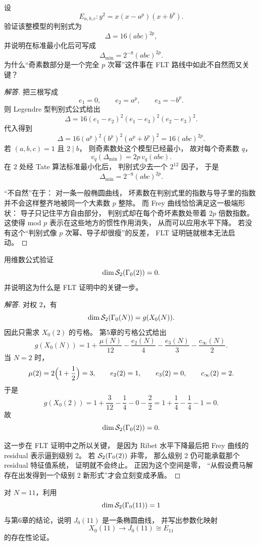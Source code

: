 \begin{exercise}
设
\[
  E_{a,b,c}\colon y^2=x(x-a^p)(x+b^p).
\]
验证该整模型的判别式为
\[
  \Delta=16(abc)^{2p},
\]
并说明在标准最小化后可写成
\[
  \Delta_{\min}=2^{-8}(abc)^{2p}.
\]
为什么“奇素数部分是一个完全 $p$ 次幂”这件事在 FLT 路线中如此不自然而又关键？
\end{exercise}

\begin{proof}[解答]
把三根写成
\[
  e_1=0,
  \qquad e_2=a^p,
  \qquad e_3=-b^p.
\]
则 Legendre 型判别式公式给出
\[
  \Delta=16(e_1-e_2)^2(e_1-e_3)^2(e_2-e_3)^2.
\]
代入得到
\[
  \Delta=16(a^p)^2(b^p)^2(a^p+b^p)^2=16(abc)^{2p}.
\]
若 $(a,b,c)=1$ 且 $2\mid b$，
则奇素数处这个模型已经最小，
故对每个奇素数 $q$，
\[
  v_q(\Delta_{\min})=2p\,v_q(abc).
\]
在 $2$ 处经 Tate 算法标准最小化后，
判别式少去一个 $2^{12}$ 因子，
于是
\[
  \Delta_{\min}=2^{-8}(abc)^{2p}.
\]

“不自然”在于：
对一条一般椭圆曲线，
坏素数在判别式里的指数与导子里的指数并不会这样整齐地被同一个大素数 $p$ 整除。
而 Frey 曲线恰恰满足这一极端形状：
导子只记住平方自由部分，
判别式却在每个奇坏素数处带着 $2p$ 倍数指数。
这使得 mod $p$ 表示在这些地方的惯性作用消失，
从而可以应用水平下降。
若没有这个“判别式像 $p$ 次幂、导子却很瘦”的反差，
FLT 证明链就根本无法启动。
\end{proof}

\begin{exercise}
用维数公式验证
\[
  \dim \mathcal{S}_2(\Gamma_0(2))=0.
\]
并说明这为什么是 FLT 证明中的关键一步。
\end{exercise}

\begin{proof}[解答]
对权 $2$，有
\[
  \dim \mathcal{S}_2(\Gamma_0(N))=g(X_0(N)).
\]
因此只需求 $X_0(2)$ 的亏格。
第5章的亏格公式给出
\[
  g(X_0(N))=1+\frac{\mu(N)}{12}-\frac{e_2(N)}{4}-\frac{e_3(N)}{3}-\frac{c_\infty(N)}{2}.
\]
当 $N=2$ 时，
\[
  \mu(2)=2\Bigl(1+\frac12\Bigr)=3,
  \qquad e_2(2)=1,
  \qquad e_3(2)=0,
  \qquad c_\infty(2)=2.
\]
于是
\[
  g(X_0(2))
  =1+\frac{3}{12}-\frac14-0-\frac22
  =1+\frac14-\frac14-1=0.
\]
故
\[
  \dim \mathcal{S}_2(\Gamma_0(2))=0.
\]

这一步在 FLT 证明中之所以关键，
是因为 Ribet 水平下降最后把 Frey 曲线的 residual 表示逼到级别 $2$。
若 $\mathcal{S}_2(\Gamma_0(2))$ 非零，
那么级别 $2$ 仍可能承载那个 residual 特征值系统，
证明就不会终止。
正因为这个空间是零，
“从假设费马解存在出发得到一个级别 $2$ 新形式”才会立刻变成矛盾。
\end{proof}

\begin{exercise}
对 $N=11$，利用
\[
  \dim \mathcal{S}_2(\Gamma_0(11))=1
\]
与第6章的结论，说明 $J_0(11)$ 是一条椭圆曲线，
并写出参数化映射
\[
  X_0(11)\to J_0(11)\cong E_{11}
\]
的存在性论证。
\end{exercise}

